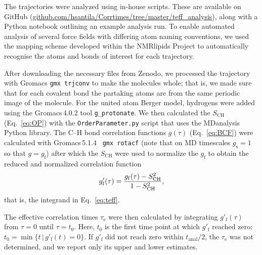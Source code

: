 \documentclass[journal=jcisd8,manuscript=article,layout=twocolumn]{achemso}
\begin{document}
The trajectories were analyzed using in-house scripts. These are available on GitHub (\url{github.com/hsantila/Corrtimes/tree/master/teff_analysis}), along with a Python notebook outlining an example analysis run.  To enable automated analysis of several force fields with differing atom naming conventions, we used the mapping scheme developed within the NMR\-lipids Project to automatically recognise the atoms and bonds of interest for each  trajectory.

After downloading the necessary files from Zenodo, we processed the trajectory with Gromacs \texttt{gmx trjconv} to make the molecules whole; that is, we made sure that for each covalent bond the partaking atoms are from the same periodic image of the molecule.
For the united atom Berger model, hydrogens were added using the Gromacs\,4.0.2 tool \texttt{g\_protonate}.
We then calculated the  $S_\mathrm{CH}$ (Eq.~\eqref{eq:OP}) with the \texttt{OrderParameter.py} script that uses the MDanalysis\cite{agrawal11,gowers16} Python library.
%
The \mbox{C--H} bond correlation functions
$g(\tau)$ (Eq.~\eqref{eq:BCF})
were calculated with Gromacs\,5.1.4~\cite{abraham2015gromacs} \texttt{gmx rotacf}
(note that on MD timescales \mbox{$g_\mathrm s =1$} so that $g = g_\mathrm{f}$)
after which the $S_\mathrm{CH}$ were used to
normalize the $g_\mathrm f$ to obtain %
the reduced and normalized correlation function
\begin{equation}
\label{eq:nBCF}
g'_{\mathrm{f}}(\tau)=\frac{g_{\mathrm{f}}(\tau)-S^{2}_{\rm{CH}}}{1-S^2_{\mathrm{CH}}},
\end{equation}
that is, the integrand in Eq.~\eqref{eq:teff}. 

The effective correlation times $\tau_\mathrm e$ were then calculated by integrating $g'_\mathrm f(\tau)$
from $\tau=0$ until $\tau = t_0$.
Here, $t_\mathrm 0$ is the first time point at which $g'_\mathrm f$ reached zero: $t_0 = \min
	\{
	t\,|\,g'_\mathrm f(t)=0
	\}
$.
%
If $g'_\mathrm f$ did not reach zero within 
$t_\mathrm{anal}/2$, the 
$\tau_\mathrm e$ was not determined,
and we report only its upper and lower estimates.
\end{document}
